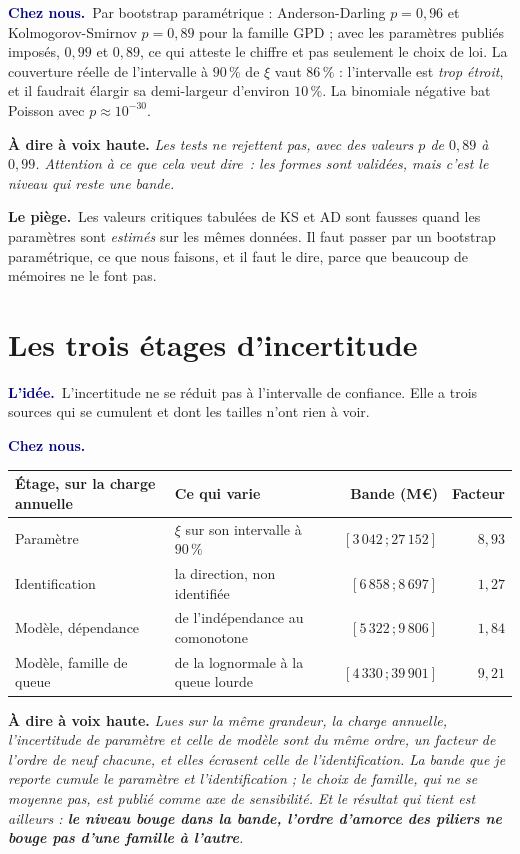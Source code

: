 \documentclass[11pt,a4paper]{article}
\newcommand{\lidee}[1]{\smallskip\noindent\textcolor{navy}{\textbf{L'idée.}}\ #1\par}
\newcommand{\cheznous}[1]{\smallskip\noindent\textcolor{navy}{\textbf{Chez nous.}}\ #1\par}
\newcommand{\lepiege}[1]{\smallskip\noindent\textcolor{accent}{\textbf{Le piège.}}\ #1\par}
\newcommand{\laphrase}[1]{\begin{phrasebox}\textbf{À dire à voix haute.} \emph{#1}\end{phrasebox}}
\begin{document}
\cheznous{Par bootstrap paramétrique : Anderson-Darling $p=0{,}96$ et Kolmogorov-Smirnov
$p=0{,}89$ pour la famille GPD ; avec les paramètres publiés imposés, $0{,}99$ et $0{,}89$, ce
qui atteste le chiffre et pas seulement le choix de loi. La couverture réelle de l'intervalle à
$90\,\%$ de $\xi$ vaut $86\,\%$ : l'intervalle est \emph{trop étroit}, et il faudrait élargir sa
demi-largeur d'environ $10\,\%$. La binomiale négative bat Poisson avec $p\approx10^{-30}$.}

\laphrase{Les tests ne rejettent pas, avec des valeurs $p$ de $0{,}89$ à $0{,}99$. Attention à ce
que cela veut dire~: les \emph{formes} sont validées, mais c'est le \emph{niveau} qui reste une
bande.}

\lepiege{Les valeurs critiques tabulées de KS et AD sont fausses quand les paramètres sont
\emph{estimés} sur les mêmes données. Il faut passer par un bootstrap paramétrique, ce que
nous faisons, et il faut le dire, parce que beaucoup de mémoires ne le font pas.}

\section{Les trois étages d'incertitude}

\lidee{L'incertitude ne se réduit pas à l'intervalle de confiance. Elle a trois sources qui
se cumulent et dont les tailles n'ont rien à voir.}

\cheznous{
\begin{center}\small
\begin{tabular}{@{}l l r r@{}}
\toprule
\textbf{Étage, sur la charge annuelle} & \textbf{Ce qui varie} & \textbf{Bande (M\euro)} &
\textbf{Facteur} \\
\midrule
Paramètre & $\xi$ sur son intervalle à $90\,\%$ & $[3\,042\,;27\,152]$ & $8{,}93$ \\
Identification & la direction, non identifiée & $[6\,858\,;8\,697]$ & $1{,}27$ \\
Modèle, dépendance & de l'indépendance au comonotone & $[5\,322\,;9\,806]$ & $1{,}84$ \\
Modèle, famille de queue & de la lognormale à la queue lourde & $[4\,330\,;39\,901]$ & $9{,}21$ \\
\bottomrule
\end{tabular}
\end{center}}

\laphrase{Lues sur la même grandeur, la charge annuelle, l'incertitude de paramètre et celle de
modèle sont du même ordre, un facteur de l'ordre de neuf chacune, et elles écrasent celle de
l'identification. La bande que je reporte cumule le paramètre et l'identification ; le choix de
famille, qui ne se moyenne pas, est publié comme axe de sensibilité. Et le résultat qui tient est
ailleurs : \textbf{le niveau bouge dans la bande, l'ordre d'amorce des piliers ne bouge pas d'une
famille à l'autre}.}
\end{document}
